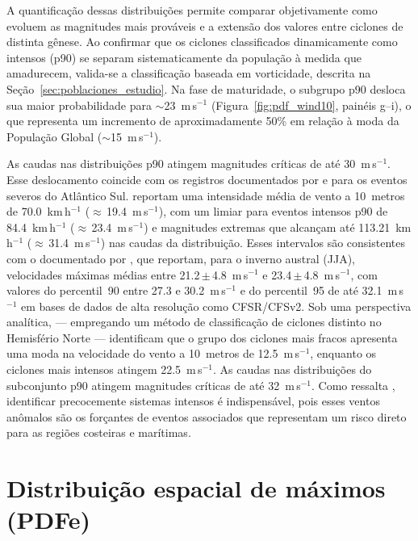 A quantificação dessas distribuições permite comparar objetivamente como evoluem as magnitudes mais prováveis e a extensão dos valores entre ciclones de distinta gênese.
Ao confirmar que os ciclones classificados dinamicamente como intensos (p90) se separam sistematicamente da população à medida que amadurecem, valida-se a classificação baseada em vorticidade, descrita na Seção~\ref{sec:poblaciones_estudio}.
Na fase de maturidade, o subgrupo p90 desloca sua maior probabilidade para $\sim$23~m\,s$^{-1}$ (Figura~\ref{fig:pdf_wind10}, painéis g--i), o que representa um incremento de aproximadamente 50\% em relação à moda da População Global ($\sim$15~m\,s$^{-1}$).

As caudas nas distribuições p90 atingem magnitudes críticas de até 30~m\,s$^{-1}$. Esse deslocamento coincide com os registros documentados por \citet{padilhareinke2026characterization} e \citet{gramcianinov2020analysis} para os eventos severos do Atlântico Sul.
\citet{padilhareinke2026characterization} reportam uma intensidade média de vento a 10~metros de 70.0~km\,h$^{-1}$ (${\approx}$\,19.4~m\,s$^{-1}$), com um limiar para eventos intensos p90 de 84.4~km\,h$^{-1}$ (${\approx}$\,23.4~m\,s$^{-1}$) e magnitudes extremas que alcançam até 113.21~km\,h$^{-1}$ (${\approx}$\,31.4~m\,s$^{-1}$) nas caudas da distribuição.
Esses intervalos são consistentes com o documentado por \citet{gramcianinov2020analysis}, que reportam, para o inverno austral (JJA), velocidades máximas médias entre 21.2\,$\pm$\,4.8~m\,s$^{-1}$ e 23.4\,$\pm$\,4.8~m\,s$^{-1}$, com valores do percentil~90 entre 27.3 e 30.2~m\,s$^{-1}$ e do percentil~95 de até 32.1~m\,s$^{-1}$ em bases de dados de alta resolução como CFSR/CFSv2.
Sob uma perspectiva analítica, \citet{corner2025classification} --- empregando um método de classificação de ciclones distinto no Hemisfério Norte --- identificam que o grupo dos ciclones mais fracos apresenta uma moda na velocidade do vento a 10~metros de 12.5~m\,s$^{-1}$, enquanto os ciclones mais intensos atingem 22.5~m\,s$^{-1}$.
As caudas nas distribuições do subconjunto p90 atingem magnitudes críticas de até 32~m\,s$^{-1}$.
Como ressalta \citet{gramcianinov2023impact}, identificar precocemente sistemas intensos é indispensável, pois esses ventos anômalos são os forçantes de eventos associados que representam um risco direto para as regiões costeiras e marítimas.


\section{Distribuição espacial de máximos (PDFe)}

